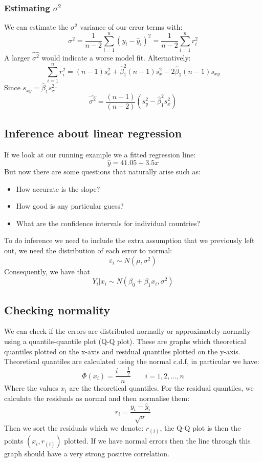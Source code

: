 \documentclass[12pt]{article}
\begin{document}
\subsubsection*{Estimating \(\sigma^2\)}
We can estimate the \(\sigma^2\) variance of our error terms with:
\[\hat{\sigma^2}=\frac{1}{n-2}\sum^n_{i=1}(y_i-\hat{y}_i)^2=\frac{1}{n-2}\sum^n_{i=1}r_i^2\]
A larger \(\hat{\sigma^2}\) would indicate a worse model fit. Alternatively:
\[\sum^n_{i=1}r_i^2=(n-1)s_x^2+\hat{\beta}_1^2(n-1)s_x^2-2\hat{\beta}_1(n-1)s_{xy}\]
Since \(s_{xy}=\hat{\beta}_1s_x^2\):
\[\hat{\sigma^2}=\frac{(n-1)}{(n-2)}\left(s_y^2-\hat{\beta}_1^2s_x^2\right)\]
\subsection*{Inference about linear regression}
If we look at our running example we a fitted regression line:
\[\hat{y}=41.05+3.5x\]
But now there are some questions that naturally arise such as:
\begin{itemize}
    \item How accurate is the slope?
    \item How good is any particular guess?
    \item What are the confidence intervals for individual countries?
\end{itemize}
To do inference we need to include the extra assumption that we previously left out, we need the distribution of each error to normal:
\[\varepsilon_i\sim N(\mu,\sigma^2)\]
Consequently, we have that
\[Y_i|x_i\sim N(\beta_0+\beta_1x_i,\sigma^2)\]
\subsection*{Checking normality}
We can check if the errors are distributed normally or approximately normally using a quantile-quantile plot (Q-Q plot). These are graphs which theoretical quantiles plotted on the x-axis and residual quantiles plotted on the y-axis. Theoretical quantiles are calculated using the normal c.d.f, in particular we have:
\[\Phi(x_i)=\frac{i-\frac{1}{2}}{n}\qquad i=1,2,...,n\]
Where the values \(x_i\) are the theoretical quantiles. For the residual quantiles, we calculate the residuals as normal and then normalise them:
\[r_i=\frac{y_i-\hat{y}_i}{\sqrt{\sigma}}\]
Then we sort the residuals which we denote: \(r_{(i)}\), the Q-Q plot is then the points \((x_i,r_{(i)})\) plotted. If we have normal errors then the line through this graph should have a very strong positive correlation.
\end{document}
